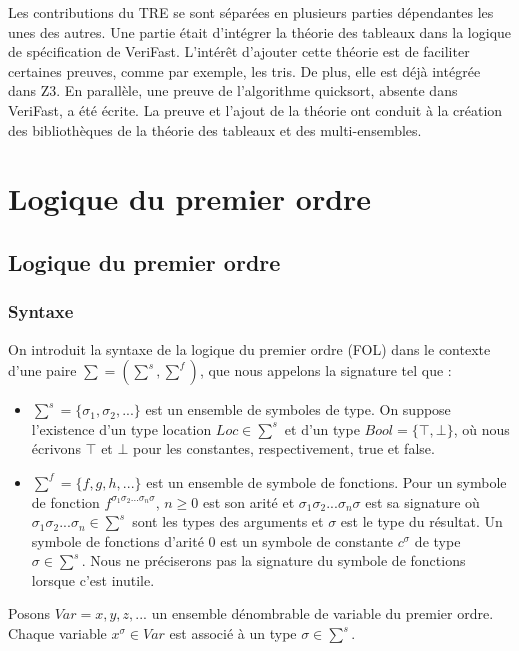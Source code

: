 \documentclass[9pt]{book}
\newcommand{\verifast}{VeriFast}
\begin{document}
	 Les contributions du TRE se sont s\'epar\'ees en plusieurs parties d\'ependantes les unes des autres. Une partie \'etait d'int\'egrer la th\'eorie des tableaux dans la logique de sp\'ecification de \verifast. L'int\'er\^et d'ajouter cette th\'eorie est de faciliter certaines preuves, comme par exemple, les tris. De plus, elle est d\'ej\`a int\'egr\'ee dans Z3. En parall\`ele, une preuve de l'algorithme quicksort, absente dans \verifast, a \'et\'e \'ecrite. La preuve et l'ajout de la th\'eorie ont conduit \`a la cr\'eation des biblioth\`eques de la th\'eorie des tableaux et des multi-ensembles.



\chapter{Logique du premier ordre}
	\section{Logique du premier ordre}
		\subsection{Syntaxe}
		On introduit la syntaxe de la logique du premier ordre (FOL) dans le contexte d'une paire $\sum = (\sum^s,\sum^f)$, que nous appelons la signature tel que :
		\begin{itemize}
		\item $\sum^s = \{ \sigma_{1}, \sigma_{2},...\}$ est un ensemble de symboles de type. On suppose l'existence d'un type location $Loc \in \sum^{s}$ et d'un type $Bool = \{ \top , \bot \}$, o\`u nous \'ecrivons $\top$ et $\bot$ pour les constantes, respectivement, true et false.
		\item $\sum^f = \{ f, g, h,...\}$ est un ensemble de symbole de fonctions. Pour un symbole de fonction $f^{\sigma_{1}\sigma_{2}... \sigma_{n}\sigma}$, $n \geq 0$ est son arit\'e et $\sigma_{1}\sigma_{2}... \sigma_{n}\sigma$ est sa signature o\`u $\sigma_{1}\sigma_{2}... \sigma_{n} \in \sum^{s}$ sont les types des arguments et $\sigma$ est le type du r\'esultat. Un symbole de fonctions d'arit\'e 0 est un symbole de constante $c^{\sigma}$ de type $\sigma \in \sum^{s}$. Nous ne pr\'eciserons pas la signature du symbole de fonctions lorsque c'est inutile.
		\end{itemize}

	   Posons $Var = {x,y,z,...}$ un ensemble d\'enombrable de variable du premier ordre. Chaque variable $x^{\sigma} \in Var$ est associ\'e \`a un type $\sigma \in \sum^{s}$.
	   
\end{document}
